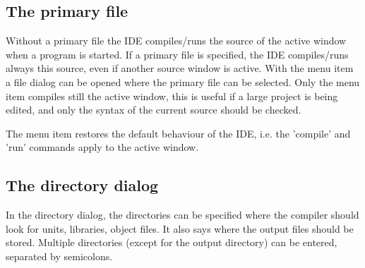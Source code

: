 \subsection{The primary file}
\label{se:primaryfile}
Without a primary file the IDE compiles/runs the source of the active
window when a program is started. If a primary file is specified, 
the IDE compiles/runs always this source, even if another
source window is active. With the menu item 
a file dialog can be opened where the primary file can be selected. 
Only the menu item  compiles still the active window, 
this is useful if a large project is being edited, and only the syntax of 
the current source should be checked. 

The menu item  restores the default
behaviour of the IDE, i.e. the 'compile' and 'run' commands apply to the 
active window.
%
%
\subsection{The directory dialog}
In the directory dialog, the directories can be specified where the 
compiler should look for units, libraries, object files. It also says
where the output files should be stored. Multiple directories (except 
for the output directory) can be entered, separated by semicolons.

